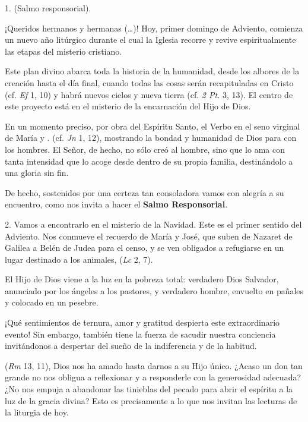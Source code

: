 				\begin{body}
					1.  (Salmo responsorial). 
					
					¡Queridos hermanos y hermanas (\ldots{})! Hoy, primer domingo de Adviento, comienza un nuevo año litúrgico durante el cual la Iglesia recorre y revive espiritualmente las etapas del misterio cristiano. 
					
					Este plan divino abarca toda la historia de la humanidad, desde los albores de la creación hasta el día final, cuando todas las cosas serán recapituladas en Cristo (cf. \emph{Ef} 1, 10) y habrá nuevos cielos y nueva tierra (cf. \emph{2 Pt.} 3, 13). El centro de este proyecto está en el misterio de la encarnación del Hijo de Dios. 
					
					En un momento preciso, por obra del Espíritu Santo, el Verbo  en el seno virginal de María y . (cf. \emph{Jn} 1, 12), mostrando la bondad y humanidad de Dios para con los hombres. El Señor, de hecho, no sólo creó al hombre, sino que lo ama con tanta intensidad que lo acoge desde dentro de su propia familia, destinándolo a una gloria sin fin. 
					
					De hecho, sostenidos por una certeza tan consoladora vamos con alegría a su encuentro, como nos invita a hacer el \textbf{Salmo Responsorial}. 
					
					2. Vamos a encontrarlo en el misterio de la Navidad. Este es el primer sentido del Adviento. Nos conmueve el recuerdo de María y José, que suben de Nazaret de Galilea a Belén de Judea para el censo, y se ven obligados a refugiarse en un lugar destinado a los animales,  (\emph{Lc} 2, 7). 
					
					El Hijo de Dios viene a la luz en la pobreza total: verdadero Dios Salvador, anunciado por los ángeles a los pastores, y verdadero hombre, envuelto en pañales y colocado en un pesebre. 
					
					¡Qué sentimientos de ternura, amor y gratitud despierta este extraordinario evento! Sin embargo, también tiene la fuerza de sacudir nuestra conciencia invitándonos a despertar del sueño de la indiferencia y de la habitud. 
					
					 (\emph{Rm} 13, 11), Dios nos ha amado hasta darnos a su Hijo único. ¿Acaso un don tan grande no nos obligua a reflexionar y a responderle con la generosidad adecuada? ¿No nos empuja a abandonar las tinieblas del pecado para abrir el espíritu a la luz de la gracia divina? Esto es precisamente a lo que nos invitan las lecturas de la liturgia de hoy. 
					

\end{body}

